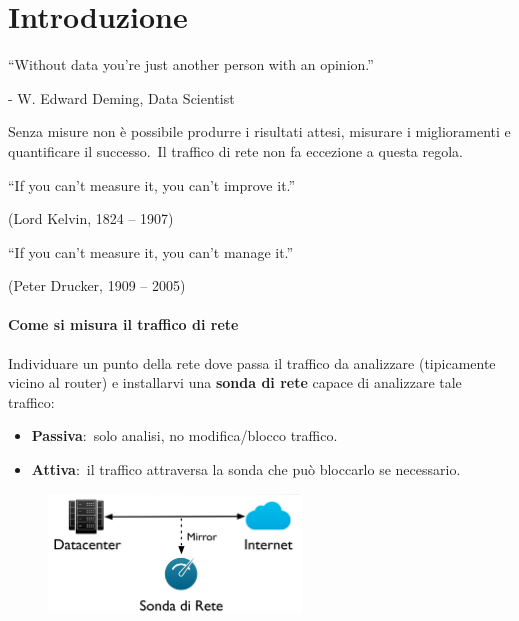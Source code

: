 \chapter{Introduzione}

\begin{center}
    ``Without data you're just another person with an opinion.''

    - W. Edward Deming, Data Scientist
\end{center}
Senza misure non è possibile produrre i risultati attesi, misurare i miglioramenti e quantificare il successo.\
Il traffico di rete non fa eccezione a questa regola.\
\begin{center}
    ``If you can't measure it, you can't improve it.''

    (Lord Kelvin, 1824 – 1907)

\end{center}
\begin{center}
    ``If you can't measure it, you can't manage it.''

    (Peter Drucker, 1909 – 2005)
\end{center}

\subsubsection{Come si misura il traffico di rete}

Individuare un punto della rete dove passa il traffico da analizzare (tipicamente vicino al router) e installarvi una \textbf{sonda di rete} capace di analizzare tale traffico:
\begin{itemize}
    \item \textbf{Passiva}:\ solo analisi, no modifica/blocco traffico.
    \item \textbf{Attiva}:\ il traffico attraversa la sonda che può bloccarlo se necessario.
\end{itemize}
\begin{figure}[H]
    \centering
    \includegraphics[width=0.6\textwidth]{immagini/Sonda_rete.jpg}
\end{figure}

